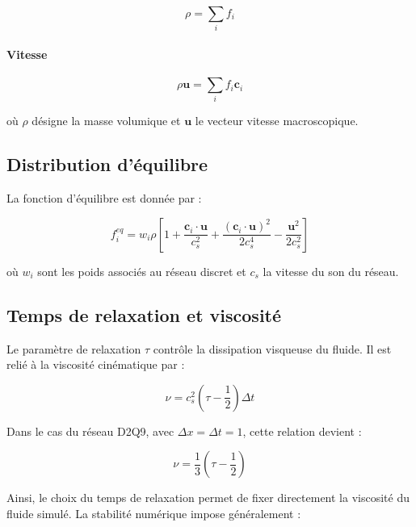\documentclass[12pt,a4paper]{report}
\begin{document}
\begin{equation}
\rho
=
\sum_i f_i
\end{equation}

\paragraph{Vitesse}

\begin{equation}
\rho \mathbf{u}
=
\sum_i f_i \mathbf{c}_i
\end{equation}

où $\rho$ désigne la masse volumique et $\mathbf{u}$ le vecteur vitesse macroscopique.

\subsection{Distribution d’équilibre}

La fonction d’équilibre est donnée par :

\begin{equation}
f_i^{eq}
=
w_i \rho
\left[
1
+
\frac{\mathbf{c}_i \cdot \mathbf{u}}{c_s^2}
+
\frac{(\mathbf{c}_i \cdot \mathbf{u})^2}{2c_s^4}
-
\frac{\mathbf{u}^2}{2c_s^2}
\right]
\end{equation}

où $w_i$ sont les poids associés au réseau discret et $c_s$ la vitesse du son du réseau.

\subsection{Temps de relaxation et viscosité}

Le paramètre de relaxation $\tau$ contrôle la dissipation visqueuse du fluide. Il est relié à la viscosité cinématique par :

\begin{equation}
\nu
=
c_s^2
\left(
\tau-\frac{1}{2}
\right)\Delta t
\end{equation}

Dans le cas du réseau D2Q9, avec $\Delta x=\Delta t=1$, cette relation devient :

\begin{equation}
\nu
=
\frac{1}{3}
\left(
\tau-\frac{1}{2}
\right)
\end{equation}

Ainsi, le choix du temps de relaxation permet de fixer directement la viscosité du fluide simulé. La stabilité numérique impose généralement :
\end{document}
